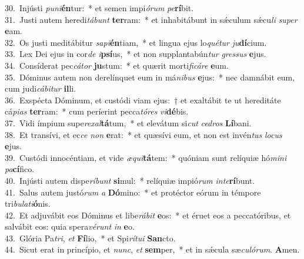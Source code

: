{30.~}Injústi \textit{pu}\textit{ni}\textbf{én}tur:~* et semen impi\textit{ó}\textit{rum} \textit{pe}\textbf{rí}bit.\\
{31.~}Justi autem heredi\textit{tá}\textit{bunt} \textbf{ter}ram:~* et inhabitábunt in sǽculum sǽcu\textit{li} \textit{su}\textit{per} \textbf{e}am.\\
{32.~}Os justi meditábitur \textit{sa}\textit{pi}\textbf{én}tiam,~* et lingua ejus lo\textit{qué}\textit{tur} \textit{ju}\textbf{dí}cium.\\
{33.~}Lex Dei ejus in cor\textit{de} \textit{i}\textbf{psí}us,~* et non supplantabún\textit{tur} \textit{gres}\textit{sus} \textbf{e}jus.\\
{34.~}Consíderat pec\textit{cá}\textit{tor} \textbf{ju}stum:~* et quærit morti\textit{fi}\textit{cá}\textit{re} \textbf{e}um.\\
{35.~}Dóminus autem non derelínquet eum in má\textit{ni}\textit{bus} \textbf{e}jus:~* nec damnábit eum, cum judi\textit{cá}\textit{bi}\textit{tur} \textbf{il}li.\\
{36.~}Exspécta Dóminum, et custódi viam ejus:~† et exaltábit te ut hereditáte cá\textit{pi}\textit{as} \textbf{ter}ram:~* cum períerint pecca\textit{tó}\textit{res} \textit{vi}\textbf{dé}bis.\\
{37.~}Vidi ímpium supe\textit{re}\textit{xal}\textbf{tá}tum,~* et elevátum si\textit{cut} \textit{ce}\textit{dros} \textbf{Lí}bani.\\
{38.~}Et transívi, et ec\textit{ce} \textit{non} \textbf{e}rat:~* et quæsívi eum, et non est invén\textit{tus} \textit{lo}\textit{cus} \textbf{e}jus.\\
{39.~}Custódi innocéntiam, et vide \textit{æ}\textit{qui}\textbf{tá}tem:~* quóniam sunt relíquiæ hó\textit{mi}\textit{ni} \textit{pa}\textbf{cí}fico.\\
{40.~}Injústi autem dispe\textit{rí}\textit{bunt} \textbf{si}mul:~* relíquiæ impió\textit{rum} \textit{in}\textit{te}\textbf{rí}bunt.\\
{41.~}Salus autem justó\textit{rum} \textit{a} \textbf{Dó}mino:~* et protéctor eórum in témpore tri\textit{bu}\textit{la}\textit{ti}\textbf{ó}nis.\\
{42.~}Et adjuvábit eos Dóminus et libe\textit{rá}\textit{bit} \textbf{e}os:~* et éruet eos a peccatóribus, et salvábit eos: quia spera\textit{vé}\textit{runt} \textit{in} \textbf{e}o.\\
{43.~}Glória Pa\textit{tri}, \textit{et} \textbf{Fí}lio,~* et Spi\textit{rí}\textit{tu}\textit{i} \textbf{San}cto.\\
{44.~}Sicut erat in princípio, et \textit{nunc}, \textit{et} \textbf{sem}per,~* et in sǽcula sæ\textit{cu}\textit{ló}\textit{rum}. \textbf{A}men.\\
